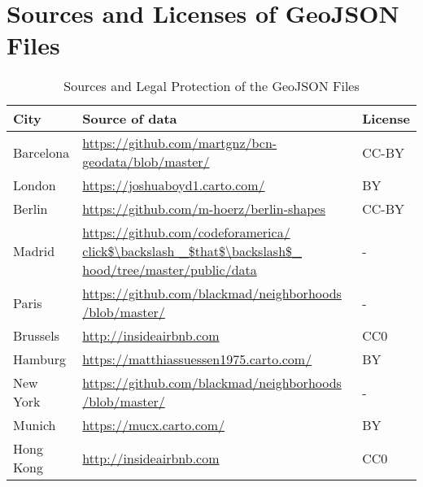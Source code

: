 \appendix
\label{sec:appendix}

\section{Sources and Licenses of GeoJSON Files}\label{subsec:geojson}

\begin{table}[h]
	\centering
	\caption{Sources and Legal Protection of the GeoJSON Files}
	\label{table_5.2}
	\begin{tabular}{p{2cm} p{8cm} p{2cm}}
		\toprule
		City      & Source of data                                                              & License                     \\
		\midrule
		Barcelona & \url{https://github.com/martgnz/bcn-geodata/blob/master/}                         & CC-BY                       \\
		London    & \url{https://joshuaboyd1.carto.com/}                                            & BY                          \\
		Berlin    & \url{https://github.com/m-hoerz/berlin-shapes}                                    & CC-BY                     \\
		Madrid    & \url{https://github.com/codeforamerica/ click$\backslash \_$that$\backslash$\_ hood/tree/master/public/data} & -               \\
		Paris     & \url{https://github.com/blackmad/neighborhoods /blob/master/}                      & -               \\
		Brussels  & \url{http://insideairbnb.com}                                                     & CC0     \\
		Hamburg   & \url{https://matthiassuessen1975.carto.com/}                                      & BY                          \\
		New York  & \url{https://github.com/blackmad/neighborhoods /blob/master/}                      & -              \\
		Munich    & \url{https://mucx.carto.com/}                                                     & BY                          \\
		Hong Kong & \url{http://insideairbnb.com}                                                     & CC0 \\
		\bottomrule
	\end{tabular}
\end{table}

